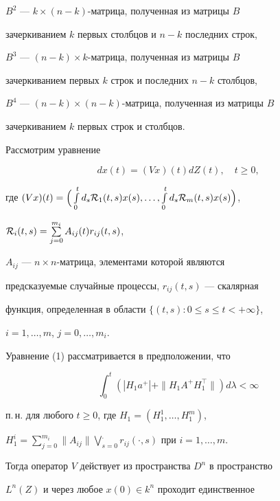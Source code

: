 $B^2$ --- $k\times (n-k)$-матрица, полученная из матрицы $B$ 


зачеркиванием $k$ первых столбцов и $n-k$ последних строк, 


$B^3$ --- $(n-k)\times k$-матрица, полученная из матрицы $B$ 


зачеркиванием первых $k$ строк и последних $n - k$ столбцов, 


$B^4$ --- $(n-k)\times (n-k)$-матрица, полученная из матрицы $B$ 


зачеркиванием $k$ первых строк и столбцов. 





Рассмотрим уравнение 


\begin{equation}


dx(t) = (Vx)(t)dZ(t),\quad t \ge 0,


\end{equation}


где $(Vx)(t) = \Big(\int \limits_0^td_s{\cal R}_1(t,s)x(s),\dotsc, 


\int \limits_0^td_s{\cal R}_m(t,s)x(s)\Big)$, 


${\cal R}_i(t,s) = \sum \limits_{j=0}^{m_i}A_{ij}(t)r_{ij}(t,s)$, 


$A_{ij}$ --- $n\times n$-матрица, элементами которой являются 


предсказуемые случайные процессы, $r_{ij}(t,s)$ --- скалярная 


функция, определенная в области $\{(t,s): 0 \le s \le t < +\infty \}$, 


$i = 1,\dotsc, m$, $j = 0,\dotsc, m_i$.





Уравнение (1) рассматривается в предположении, что 


$$


\int_0^t(|H_1a^+| + \|H_1A^+H_1^\top \|)d\lambda < \infty


$$ 


п.\,н. для любого $t \ge 0$, где $H_1 = (H_1^1,\dotsc, H_1^m)$, 


$H_1^i = \sum \limits_{j=0}^{m_i}\|A_{ij}\|


\bigvee \limits_{s=0}^{\displaystyle .}r_{ij}(\cdot,s)$ при $i=1,\dotsc, m$. 


Тогда оператор $V$ действует из пространства $D^n$ в пространство 


$L^n(Z)$ и через любое $x(0) \in k^n$ проходит единственное 



